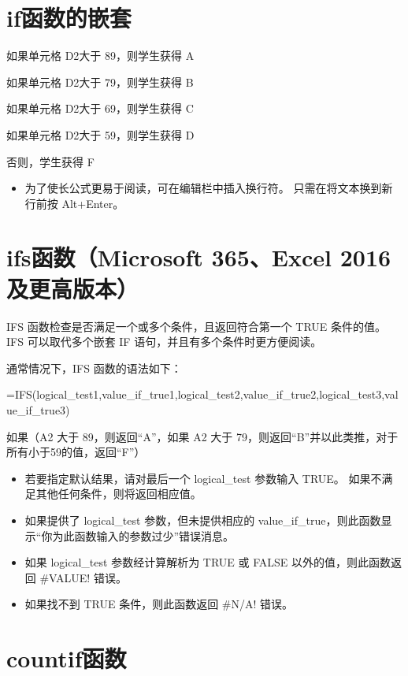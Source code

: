 \section{if函数的嵌套}


如果单元格 D2大于 89，则学生获得 A

如果单元格 D2大于 79，则学生获得 B

如果单元格 D2大于 69，则学生获得 C

如果单元格 D2大于 59，则学生获得 D

否则，学生获得 F

\begin{itemize}
    \item 为了使长公式更易于阅读，可在编辑栏中插入换行符。 只需在将文本换到新行前按 Alt+Enter。
\end{itemize}

\section{ifs函数（Microsoft 365、Excel 2016 及更高版本）}

IFS 函数检查是否满足一个或多个条件，且返回符合第一个 TRUE 条件的值。 IFS 可以取代多个嵌套 IF 语句，并且有多个条件时更方便阅读。

通常情况下，IFS 函数的语法如下：

=IFS(logical\_test1,value\_if\_true1,logical\_test2,value\_if\_true2,logical\_test3,value\_if\_true3)


如果（A2 大于 89，则返回``A''，如果 A2 大于 79，则返回``B''并以此类推，对于所有小于59的值，返回``F''）

\begin{itemize}
    \item 若要指定默认结果，请对最后一个 logical\_test 参数输入 TRUE。 如果不满足其他任何条件，则将返回相应值。
    \item 如果提供了 logical\_test 参数，但未提供相应的 value\_if\_true，则此函数显示``你为此函数输入的参数过少''错误消息。
    \item 如果 logical\_test 参数经计算解析为 TRUE 或 FALSE 以外的值，则此函数返回 \#VALUE! 错误。
    \item 如果找不到 TRUE 条件，则此函数返回 \#N/A! 错误。
\end{itemize}

\section{countif函数}

